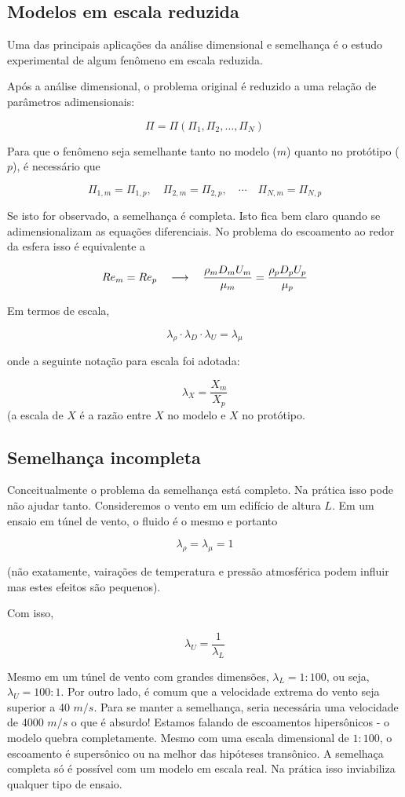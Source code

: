 \subsection{Modelos em escala reduzida}

Uma das principais aplicações da análise dimensional e semelhança é o estudo experimental de algum fenômeno em escala reduzida. 

Após a análise dimensional, o problema original é reduzido a uma relação de parâmetros adimensionais:

\[
\Pi = \Pi\left(\Pi_1, \Pi_2, \ldots, \Pi_N \right)
\]

Para que o fenômeno seja semelhante tanto no modelo ($m$) quanto no protótipo ($p$), é necessário que

\[
\Pi_{1,m} = \Pi_{1,p}, \quad \Pi_{2,m} = \Pi_{2,p}, \quad \cdots \quad \Pi_{N,m} = \Pi_{N,p}
\]

Se isto for observado, a semelhança é completa. Isto fica bem claro quando se adimensionalizam as equações diferenciais. No problema do escoamento ao redor da esfera isso é equivalente a

\[
Re_m = Re_p \quad\longrightarrow\quad \frac{\rho_m D_m U_m}{\mu_m} = \frac{\rho_p D_p U_p}{\mu_p}
\]

Em termos de escala,

\[
\lambda_\rho \cdot \lambda_D \cdot \lambda_U = \lambda_\mu
\]


onde a seguinte notação para escala foi adotada:

\[
\lambda_X = \frac{X_m}{X_p}
\]
(a escala de $X$ é a razão entre $X$ no modelo e $X$ no protótipo.

\subsection{Semelhança incompleta}
Conceitualmente o problema da semelhança está completo. Na prática isso pode não ajudar tanto. Consideremos o vento em um edifício de altura $L$. Em um ensaio em túnel de vento, o fluido é o mesmo e portanto

\[
\lambda_\rho = \lambda_\mu = 1
\]

(não exatamente, vairações de temperatura e pressão atmosférica podem influir mas estes efeitos são pequenos).

Com isso,

\[
\lambda_U = \frac{1}{\lambda_L}
\]

Mesmo em um túnel de vento com grandes dimensões, $\lambda_L = 1:100$, ou seja, $\lambda_U = 100:1$. Por outro lado, é comum que a velocidade extrema do vento seja superior a 40 $m/s$. Para se manter a semelhança, seria necessária uma velocidade de 4000 $m/s$ o que é absurdo! Estamos falando de escoamentos hipersônicos - o modelo quebra completamente. Mesmo com uma escala dimensional de $1:100$, o escoamento é supersônico ou na melhor das hipóteses transônico. A semelhaça completa só é possível com um modelo em escala real. Na prática isso inviabiliza qualquer tipo de ensaio. 

